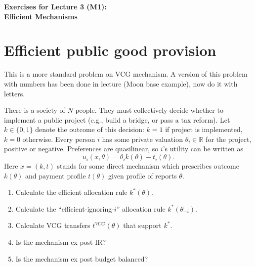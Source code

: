 \documentclass[a4paper]{article}
\newif\ifsolutions
\begin{document}
\begin{center}
		\LARGE\textbf{Exercises for Lecture 3 (M1):\\ Efficient Mechanisms}
\end{center}



\section{Efficient public good provision}
	
	This is a more standard problem on VCG mechanism. A version of this problem with numbers has been done in lecture (Moon base example), now do it with letters.
	
	There is a society of $N$ people. They must collectively decide whether to implement a public project (e.g., build a bridge, or pass a tax reform). Let $k \in \{0,1\}$ denote the outcome of this decision: $k=1$ if project is implemented, $k=0$ otherwise. Every person $i$ has some private valuation $\theta_i \in \mathbb{R}$ for the project, positive or negative. Preferences are quasilinear, so $i$'s utility can be written as
	$$
		u_i(x,\theta) = \theta_i k(\theta) - t_i(\theta).
	$$
	Here $x=(k,t)$ stands for some direct mechanism which prescribes outcome $k(\theta)$ and payment profile $t(\theta)$ given profile of reports $\theta$.
	
	\begin{enumerate}
		\item Calculate the efficient allocation rule $k^*(\theta)$.
		\item Calculate the ``efficient-ignoring-$i$'' allocation rule $k^*(\theta_{-i})$.
		\item Calculate VCG transfers $t^{VCG}(\theta)$ that support $k^*$.
		\item Is the mechanism ex post IR?
		\item Is the mechanism ex post budget balanced?
	\end{enumerate}
	
\ifsolutions
\end{document}
